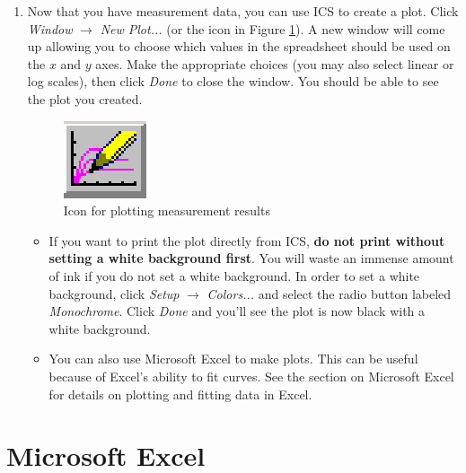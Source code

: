 \documentclass{article}
\begin{document}
\begin{enumerate}
  \item Now that you have measurement data, you can use ICS to create a plot. Click \textit{Window} $\rightarrow$ \textit{New Plot...} (or the icon in Figure \ref{plot}). A new window will come up allowing you to choose which values in the spreadsheet should be used on the $x$ and $y$ axes. Make the appropriate choices (you may also select linear or log scales), then click \textit{Done} to close the window. You should be able to see the plot you created.

\begin{figure}[!htb]
  \centering
  \includegraphics{plot.eps}
  \caption{Icon for plotting measurement results}
  \label{plot}
\end{figure}

    \begin{itemize}
      \item If you want to print the plot directly from ICS, \textbf{do not print without setting a white background first}. You will waste an immense amount of ink if you do not set a white background. In order to set a white background, click \textit{Setup} $\rightarrow$ \textit{Colors...} and select the radio button labeled \textit{Monochrome}. Click \textit{Done} and you'll see the plot is now black with a white background.
      \item You can also use Microsoft Excel to make plots. This can be useful because of Excel's ability to fit curves. See the section on Microsoft Excel for details on plotting and fitting data in Excel.
    \end{itemize}
\end{enumerate}

\section{Microsoft Excel}
\end{document}
